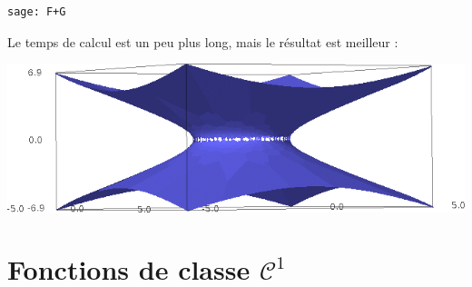 \begin{example}
\begin{verbatim}
sage: F+G
    \end{verbatim}
    Le temps de calcul est un peu plus long, mais le résultat est meilleur :
    \begin{center}
            \includegraphics[width=15cm]{pictures_bitmap/AdSbon.png}
    \end{center}
\end{example}




\section{Fonctions de classe $\mathcal{C}^1$}

